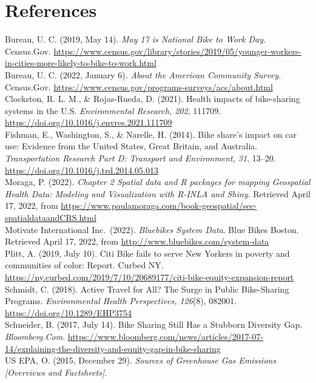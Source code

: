 \documentclass[
  12pt,
]{article}
\begin{document}
\newpage

\hypertarget{references}{%
\section{References}\label{references}}

Bureau, U. C. (2019, May 14). \emph{May 17 is National Bike to Work
Day}. Census.Gov.
\url{https://www.census.gov/library/stories/2019/05/younger-workers-in-cities-more-likely-to-bike-to-work.html}\\
Bureau, U. C. (2022, January 6). \emph{About the American Community
Survey}. Census.Gov.
\url{https://www.census.gov/programs-surveys/acs/about.html}\\
Clockston, R. L. M., \& Rojas-Rueda, D. (2021). Health impacts of
bike-sharing systems in the U.S. \emph{Environmental Research, 202},
111709. \url{https://doi.org/10.1016/j.envres.2021.111709}\\
Fishman, E., Washington, S., \& Narelle, H. (2014). Bike share's impact
on car use: Evidence from the United States, Great Britain, and
Australia. \emph{Transportation Research Part D: Transport and
Environment, 31}, 13--20.
\url{https://doi.org/10.1016/j.trd.2014.05.013}\\
Moraga, P. (2022). \emph{Chapter 2 Spatial data and R packages for
mapping \textbar{} Geospatial Health Data: Modeling and Visualization
with R-INLA and Shiny}. Retrieved April 17, 2022, from
\url{https://www.paulamoraga.com/book-geospatial/sec-spatialdataandCRS.html}\\
Motivate International Inc.~(2022). \emph{Bluebikes System Data}. Blue
Bikes Boston. Retrieved April 17, 2022, from
\url{http://www.bluebikes.com/system-data}\\
Plitt, A. (2019, July 10). Citi Bike fails to serve New Yorkers in
poverty and communities of color: Report. Curbed NY.
\url{https://ny.curbed.com/2019/7/10/20689177/citi-bike-equity-expansion-report}\\
Schmidt, C. (2018). Active Travel for All? The Surge in Public
Bike-Sharing Programs. \emph{Environmental Health Perspectives, 126}(8),
082001. \url{https://doi.org/10.1289/EHP3754}\\
Schneider, B. (2017, July 14). Bike Sharing Still Has a Stubborn
Diversity Gap. \emph{Bloomberg.Com}.
\url{https://www.bloomberg.com/news/articles/2017-07-14/explaining-the-diversity-and-equity-gap-in-bike-sharing}\\
US EPA, O. (2015, December 29). \emph{Sources of Greenhouse Gas
Emissions {[}Overviews and Factsheets{]}}.
\end{document}
